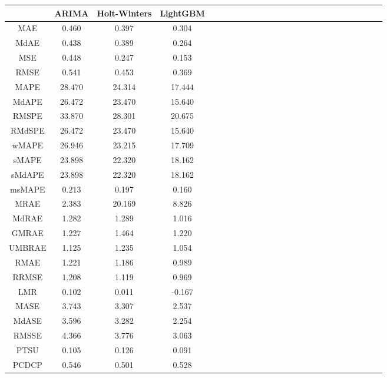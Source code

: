 \begin{tabular}{ccccccccccccccccccccccccc}
\toprule
 & ARIMA & Holt-Winters & LightGBM \\
\midrule
MAE & 0.460 & 0.397 & 0.304 \\
MdAE & 0.438 & 0.389 & 0.264 \\
MSE & 0.448 & 0.247 & 0.153 \\
RMSE & 0.541 & 0.453 & 0.369 \\
MAPE & 28.470 & 24.314 & 17.444 \\
MdAPE & 26.472 & 23.470 & 15.640 \\
RMSPE & 33.870 & 28.301 & 20.675 \\
RMdSPE & 26.472 & 23.470 & 15.640 \\
wMAPE & 26.946 & 23.215 & 17.709 \\
sMAPE & 23.898 & 22.320 & 18.162 \\
sMdAPE & 23.898 & 22.320 & 18.162 \\
msMAPE & 0.213 & 0.197 & 0.160 \\
MRAE & 2.383 & 20.169 & 8.826 \\
MdRAE & 1.282 & 1.289 & 1.016 \\
GMRAE & 1.227 & 1.464 & 1.220 \\
UMBRAE & 1.125 & 1.235 & 1.054 \\
RMAE & 1.221 & 1.186 & 0.989 \\
RRMSE & 1.208 & 1.119 & 0.969 \\
LMR & 0.102 & 0.011 & -0.167 \\
MASE & 3.743 & 3.307 & 2.537 \\
MdASE & 3.596 & 3.282 & 2.254 \\
RMSSE & 4.366 & 3.776 & 3.063 \\
PTSU & 0.105 & 0.126 & 0.091 \\
PCDCP & 0.546 & 0.501 & 0.528 \\
\bottomrule
\end{tabular}
